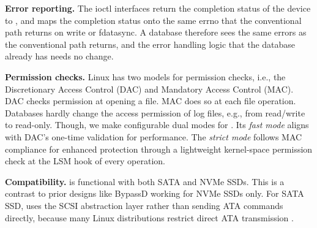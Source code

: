 {\bf Error reporting.} The ioctl interfaces return the completion status of the
device to \odes, and \odes maps the completion status onto the same errno that the
conventional path returns on write or fdatasync. A database therefore sees the same
errors as the conventional path returns, and the error handling logic that the
database already has needs no change.

{\bf Permission checks.} 
 Linux has two models for     permission checks, i.e., the Discretionary
Access Control (DAC) and Mandatory Access Control (MAC). 
DAC checks   permission   at
opening a file. MAC does so at each file operation.
Databases hardly change the access permission of log files, e.g., from read/write to read-only.
Though, we
make  configurable dual modes for \odes.
Its {\em fast mode} aligns  with DAC's one-time validation for   performance.
The {\em strict mode} follows  MAC compliance for enhanced protection
 through   a lightweight kernel-space permission check at the LSM hook of every    operation.

{\bf Compatibility.}
\odes   is  functional with both SATA and NVMe SSDs. This is a contrast to prior designs like BypassD working for NVMe SSDs only.
For SATA SSD, \odes uses the SCSI abstraction layer rather than sending ATA commands directly, %
 because many Linux distributions restrict direct ATA transmission \cite{libATADe51:online}. 


